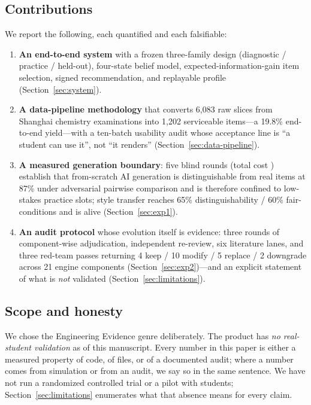 \documentclass[11pt]{article}
\begin{document}
\subsection{Contributions}
We report the following, each quantified and each falsifiable:
\begin{enumerate}\setlength{\itemsep}{0pt}\setlength{\parskip}{0pt}\setlength{\parsep}{0pt}
\item \textbf{An end-to-end system} with a frozen three-family design (diagnostic / practice / held-out), four-state belief model, expected-information-gain item selection, signed recommendation, and replayable profile (Section~\ref{sec:system}).
\item \textbf{A data-pipeline methodology} that converts 6,083 raw slices from Shanghai chemistry examinations into 1,202 serviceable items---a 19.8\% end-to-end yield---with a ten-batch usability audit whose acceptance line is ``a student can use it'', not ``it renders'' (Section~\ref{sec:data-pipeline}).
\item \textbf{A measured generation boundary}: five blind rounds (total cost ) establish that from-scratch AI generation is distinguishable from real items at 87\% under adversarial pairwise comparison and is therefore confined to low-stakes practice slots; style transfer reaches 65\% distinguishability / 60\% fair-conditions and is alive (Section~\ref{sec:exp1}).
\item \textbf{An audit protocol} whose evolution itself is evidence: three rounds of component-wise adjudication, independent re-review, six literature lanes, and three red-team passes returning 4 keep / 10 modify / 5 replace / 2 downgrade across 21 engine components (Section~\ref{sec:exp2})---and an explicit statement of what is \emph{not} validated (Section~\ref{sec:limitations}).
\end{enumerate}

\subsection{Scope and honesty}
We chose the Engineering Evidence genre deliberately. The product has \emph{no real-student validation} as of this manuscript. Every number in this paper is either a measured property of code, of files, or of a documented audit; where a number comes from simulation or from an audit, we say so in the same sentence. We have not run a randomized controlled trial or a pilot with students; Section~\ref{sec:limitations} enumerates what that absence means for every claim.
\end{document}
